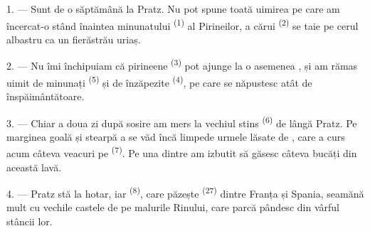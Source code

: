 %

\VUsaut{4.0mm}
\VUsaut{3.0mm}

\VUsaut{3.0mm}

\VUsaut{3.0mm}

1. --- Sunt de o săptămână la Pratz. Nu pot spune toată uimirea pe care am
încercat-o stând înaintea minunatului 
\textsuperscript{(1)} al Pirineilor, a cărui 
\textsuperscript{(2)} se taie pe cerul albastru ca un fierăstrău uriaș.

2. --- Nu îmi închipuiam că  pirineene \textsuperscript{(3)} pot
ajunge la o asemenea , și am rămas uimit de 
minunați \textsuperscript{(5)} și de  înzăpezite
\textsuperscript{(4)}, pe care se năpustesc  atât de
înspăimântătoare.

\VUsaut{3.0mm}
\VUsaut{3.0mm}

3. --- Chiar a doua zi după sosire am mers la vechiul  stins
\textsuperscript{(6)} de lângă Pratz. Pe marginea goală și stearpă a
 se văd încă limpede urmele lăsate de , care a curs
acum câteva veacuri pe  \textsuperscript{(7)}. Pe una
dintre  am izbutit să găsesc câteva bucăți din această lavă.

4. --- Pratz stă la hotar, iar  \textsuperscript{(8)}, care
păzește  \textsuperscript{(27)} dintre Franța și Spania,
seamănă mult cu vechile castele de pe malurile Rinului, care parcă pândesc
 din vârful stâncii lor.

